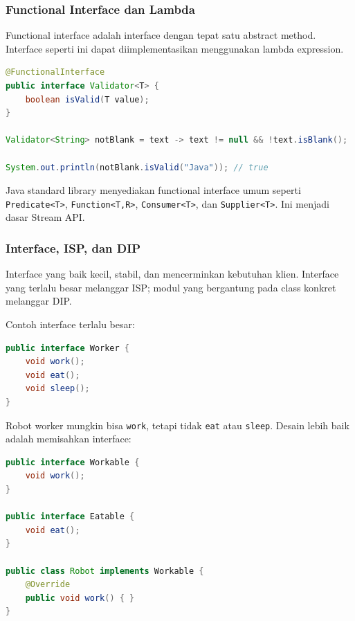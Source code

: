 \subsubsection{Functional Interface dan Lambda}

\begin{jawab}
Functional interface adalah interface dengan tepat satu abstract method. Interface seperti ini dapat diimplementasikan menggunakan lambda expression.
\end{jawab}

\begin{lstlisting}[language=Java, caption={Functional interface dan lambda}, label={lst:functional-interface}]
@FunctionalInterface
public interface Validator<T> {
    boolean isValid(T value);
}

Validator<String> notBlank = text -> text != null && !text.isBlank();

System.out.println(notBlank.isValid("Java")); // true
\end{lstlisting}

Java standard library menyediakan functional interface umum seperti \texttt{Predicate<T>}, \texttt{Function<T,R>}, \texttt{Consumer<T>}, dan \texttt{Supplier<T>}. Ini menjadi dasar Stream API.

\subsubsection{Interface, ISP, dan DIP}

\begin{jawab}
Interface yang baik kecil, stabil, dan mencerminkan kebutuhan klien. Interface yang terlalu besar melanggar ISP; modul yang bergantung pada class konkret melanggar DIP.
\end{jawab}

Contoh interface terlalu besar:

\begin{lstlisting}[language=Java, caption={Fat interface yang memaksa method tidak relevan}, label={lst:fat-interface}]
public interface Worker {
    void work();
    void eat();
    void sleep();
}
\end{lstlisting}

Robot worker mungkin bisa \texttt{work}, tetapi tidak \texttt{eat} atau \texttt{sleep}. Desain lebih baik adalah memisahkan interface:

\begin{lstlisting}[language=Java, caption={Interface kecil sesuai ISP}, label={lst:small-interface}]
public interface Workable {
    void work();
}

public interface Eatable {
    void eat();
}

public class Robot implements Workable {
    @Override
    public void work() { }
}
\end{lstlisting}

